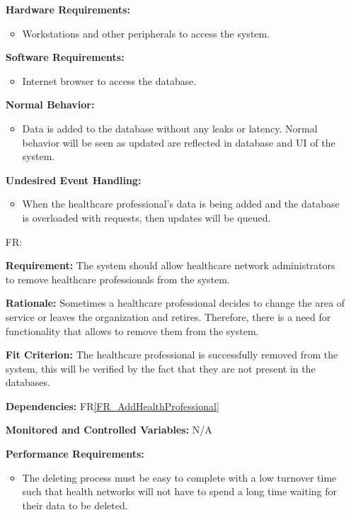 \documentclass[12pt]{article}
\newcounter{reqnum} %
\begin{document}
\begin{itemize}
  \textbf{Hardware Requirements:} 
  \begin{itemize}
    \item Workstations and other peripherals to access the system.
  \end{itemize}
  
  \textbf{Software Requirements:} 
  \begin{itemize}
    \item Internet browser to access the database.
  \end{itemize}
  
  \textbf{Normal Behavior:}
  \begin{itemize}
    \item Data is added to the database without any leaks or latency. Normal behavior will be seen as updated are reflected in database and UI of the system.
  \end{itemize} 
  
  \textbf{Undesired Event Handling:}
  \begin{itemize}
    \item When the healthcare professional's data is being added and the database is overloaded with requests, then updates will be queued.
  \end{itemize} 
  
  \item[FR\refstepcounter{reqnum}\thereqnum \label{FR_RemoveHealthProfessionals}:] 
  
  \textbf{Requirement:} The system should allow healthcare network administrators to remove healthcare professionals from the system. 
  
  \textbf{Rationale:} Sometimes a healthcare professional decides to change the area of service or leaves the organization and retires. Therefore, there is a need for functionality that allows to remove them from the system.
  
  \textbf{Fit Criterion:} The healthcare professional is successfully removed from the system, this will be verified by the fact that they are not present in the databases. 
  
  \textbf{Dependencies:} FR\ref{FR_AddHealthProfessional}
  
  \textbf{Monitored and Controlled Variables:} N/A
  
  \textbf{Performance Requirements:}
  \begin{itemize}
    \item The deleting process must be easy to complete with a low turnover time such that health networks will not have to spend a long time waiting for their data to be deleted.
  \end{itemize} 
  

\end{itemize}
\end{document}
